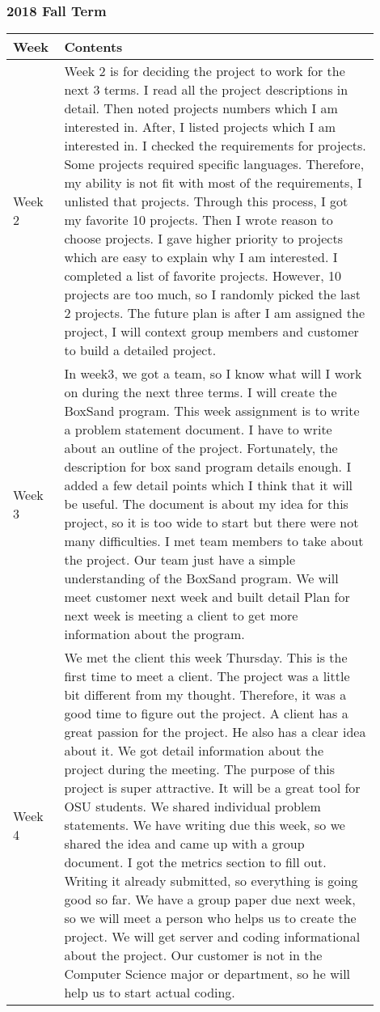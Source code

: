 \documentclass[10pt]{article}
\begin{document}
        \subsubsection{2018 Fall Term}
            \begin{center}
            \begin{tabular}{ | p{0.1\linewidth} | p{0.8\linewidth} | } \hline
                Week & Contents  \\ \hline
                Week 2 & Week 2 is for deciding the project to work for the next 3 terms. I read all the project descriptions in detail. Then noted projects numbers which I am interested in. After, I listed projects which I am interested in. I checked the requirements for projects. Some projects required specific languages. Therefore, my ability is not fit with most of the requirements, I unlisted that projects. Through this process, I got my favorite 10 projects. Then I wrote reason to choose projects. I gave higher priority to projects which are easy to explain why I am interested. I completed a list of favorite projects. However, 10 projects are too much, so I randomly picked the last 2 projects. The future plan is after I am assigned the project, I will context group members and customer to build a detailed project.  \\ \hline
                Week 3 & In week3, we got a team, so I know what will I work on during the next three terms. I will create the BoxSand program. This week assignment is to write a problem statement document. I have to write about an outline of the project. Fortunately, the description for box sand program details enough. I added a few detail points which I think that it will be useful. The document is about my idea for this project, so it is too wide to start but there were not many difficulties. I met team members to take about the project. Our team just have a simple understanding of the BoxSand program. We will meet customer next week and built detail Plan for next week is meeting a client to get more information about the program.  \\ \hline
                Week 4 & We met the client this week Thursday. This is the first time to meet a client. The project was a little bit different from my thought. Therefore, it was a good time to figure out the project. A client has a great passion for the project. He also has a clear idea about it. We got detail information about the project during the meeting. The purpose of this project is super attractive. It will be a great tool for OSU students. We shared individual problem statements. We have writing due this week, so we shared the idea and came up with a group document. I got the metrics section to fill out. Writing it already submitted, so everything is going good so far. We have a group paper due next week, so we will meet a person who helps us to create the project. We will get server and coding informational about the project. Our customer is not in the Computer Science major or department, so he will help us to start actual coding.  \\ \hline

\end{tabular}
\end{center}
\end{document}

